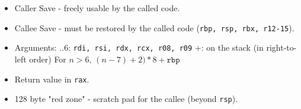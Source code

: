 \begin{itemize}
\begin{itemize}
		\item Caller Save - freely usable by the called code.
		\item Callee Save - must be restored by the called code (\texttt{rbp, rsp, rbx, r12-15}).
		
		\item Arguments: ..6: \texttt{rdi, rsi, rdx, rcx, r08, r09} +: on the stack (in right-to-left order) \newline
		For $n > 6$, $(n-7) + 2) * 8 + \texttt{rbp}$
		
		\item Return value in \texttt{rax}.

		\item 128 byte "red zone" - scratch pad for the callee (beyond \texttt{rsp}).
	\end{itemize}
\end{itemize}
